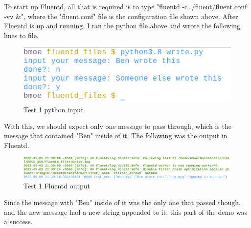\documentclass{article}
\begin{document}
To start up Fluentd, all that is required is to type "fluentd -c ./fluent/fluent.conf -vv \&", where the "fluent.conf" file is the configuration file shown above. After Fluentd is up and running, I ran the python file above and wrote the following lines
to file.
\begin{figure}[H]
    \centering
    \includegraphics[scale=0.8]{images/t1_3.png}
    \caption{Test 1 python input}
    \label{fig:pic5}
\end{figure}
With this, we should expect only one message to pass through, which is the message that contained "Ben" inside of it. The following was the output in Fluentd.
\begin{figure}[H]
    \centering
    \includegraphics[scale=0.55]{images/t1_4.png}
    \caption{Test 1 Fluentd output}
    \label{fig:pic6}
\end{figure}
Since the message with "Ben" inside of it was the only one that passed though, and the new message had a new string appended to it, this part of the demo was a success.
\end{document}
